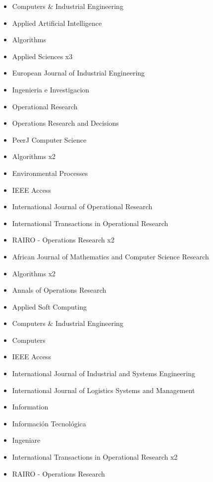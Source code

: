 {\begin{itemize}
\item Computers \& Industrial Engineering
\item Applied Artificial Intelligence
\item Algorithms
\item Applied Sciences x3
\item European Journal of Industrial Engineering
\item Ingenieria e Investigacion
\item Operational Research
\item Operations Research and Decisions
\item PeerJ Computer Science
\end{itemize}
}

{\begin{itemize}
\item Algorithms x2
\item Environmental Processes
\item IEEE Access
\item International Journal of Operational Research
\item International Transactions in Operational Research
\item RAIRO - Operations Research x2
\end{itemize}
}

{\begin{itemize}
\item African Journal of Mathematics and Computer Science Research
\item Algorithms x2
\item Annals of Operations Research
\item Applied Soft Computing
\item Computers \& Industrial Engineering
\item Computers
\item IEEE Access
\item International Journal of Industrial and Systems Engineering
\item International Journal of Logistics Systems and Management 
\item Information
\item Informaci\'on Tecnol\'ogica
\item Ingeniare
\item International Transactions in Operational Research x2
\item RAIRO - Operations Research
\end{itemize}
}

